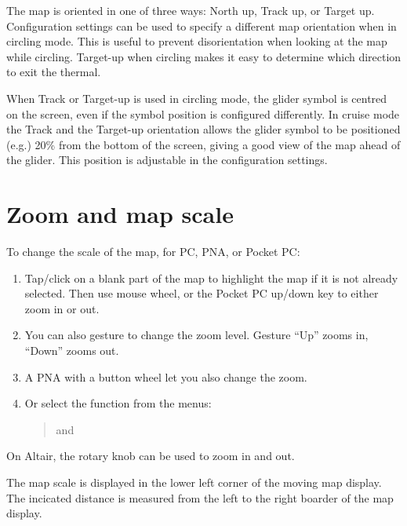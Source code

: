 The map is oriented in one of three ways: North up,
Track up, or Target up.  Configuration settings  can be used
to specify a different map orientation when in circling mode. This is useful to prevent
disorientation when looking at the map while circling.  Target-up when
circling makes it easy to determine which direction to exit the
thermal.

When Track or Target-up is used in circling mode, the glider symbol is
centred on the screen, even if the symbol position is configured differently.
In cruise mode the Track and the Target-up orientation allows the glider
symbol to be positioned (e.g.) 20\% from the bottom of the screen, giving a good view of the
map ahead of the glider.  This position is adjustable in the configuration
 settings.

\section{Zoom and map scale}

To change the scale of the map, for PC, PNA, or Pocket PC:
\begin{enumerate}
\item Tap/click on a blank part of the map to highlight the map if it is not
already selected.
Then use mouse wheel, or the Pocket PC up/down key to either zoom
in or out.
\item You can also gesture to change the zoom level. Gesture 
``Up'' zooms in, ``Down'' zooms out.
\item A PNA with a button wheel let you also change the zoom. 
\item Or select the function from the menus:
\begin{quote}
\blink{} and \blink{}
\end{quote}
\end{enumerate}
On Altair, the rotary knob can be used to zoom in and out.

The map scale is displayed in the lower left corner of the moving map
display. The incicated distance is measured from the left to the right boarder
of the map display.

